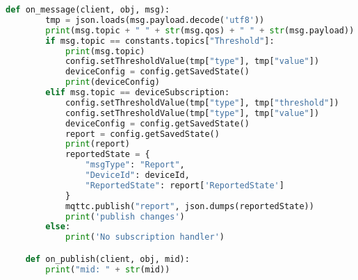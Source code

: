 \begin{lstlisting}[language=Python, caption=MQTT handler examples, label={lst:rpmqtthe}, basicstyle=\scriptsize]
    def on_message(client, obj, msg):
        tmp = json.loads(msg.payload.decode('utf8'))
        print(msg.topic + " " + str(msg.qos) + " " + str(msg.payload))
        if msg.topic == constants.topics["Threshold"]:
            print(msg.topic)
            config.setThresholdValue(tmp["type"], tmp["value"])
            deviceConfig = config.getSavedState()
            print(deviceConfig)
        elif msg.topic == deviceSubscription:
            config.setThresholdValue(tmp["type"], tmp["threshold"])
            config.setThresholdValue(tmp["type"], tmp["value"])
            deviceConfig = config.getSavedState()
            report = config.getSavedState()
            print(report)
            reportedState = {
                "msgType": "Report",
                "DeviceId": deviceId,
                "ReportedState": report['ReportedState']
            }
            mqttc.publish("report", json.dumps(reportedState))
            print('publish changes')
        else:
            print('No subscription handler')

    def on_publish(client, obj, mid):
        print("mid: " + str(mid))
\end{lstlisting}


